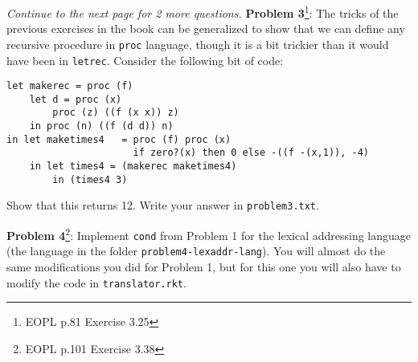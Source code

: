 \documentclass[12pt,reqno]{amsart}
\newcommand{\code}[1]{\texttt{#1}}
\begin{document}
\vspace{7.5mm}

\textit{Continue to the next page for 2 more questions.}
\newpage
\textbf{Problem 3}\footnote{EOPL p.81 Exercise 3.25}: The tricks of the previous exercises in the book can be generalized to show that we can define any recursive procedure in \code{proc} language, though it is a bit trickier than it would have been in \code{letrec}. Consider the following bit of code:
\begin{lstlisting}
let makerec = proc (f)
    let d = proc (x)
        proc (z) ((f (x x)) z)
    in proc (n) ((f (d d)) n)
in let maketimes4	= proc (f) proc (x)
        	          if zero?(x) then 0 else -((f -(x,1)), -4)
    in let times4 = (makerec maketimes4)
        in (times4 3)            			 
\end{lstlisting}
Show that this returns 12. Write your answer in \code{problem3.txt}.

\vspace{7.5mm}

\textbf{Problem 4}\footnote{EOPL p.101 Exercise 3.38}: Implement \code{cond} from Problem 1 for the lexical addressing language (the language in the folder \code{problem4-lexaddr-lang}). You will almost do the same modifications you did for Problem 1, but for this one you will also have to modify the code in \code{translator.rkt}.
\end{document}
